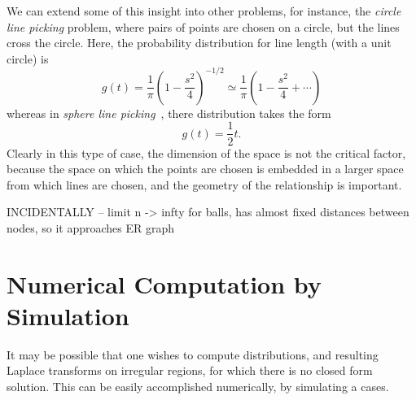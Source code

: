 \documentclass{article}
\begin{document}
We can extend some of this insight into other problems, for instance,
the {\em circle line picking} problem, where pairs of points are
chosen on a circle, but the lines cross the circle. Here, the
probability distribution for line length (with a unit circle) is
\cite{weisstein:_circle_line_picking}
\begin{equation}
  \label{eq:circle_line_picking}
  g(t) = \frac{1}{\pi} \left(    
           1 - \frac{s^2}{4}
               \right)^{-1/2} 
       \simeq \frac{1}{\pi} \left( 1 - \frac{s^2}{4} + \cdots \right) 
\end{equation}
whereas in {\em sphere line
  picking}~\cite{weisstein:_sphere_line_picking}, there distribution
takes the form
\begin{equation}
  \label{eq:sphere_line_picking_approx}
  g(t) = \frac{1}{2} t.
\end{equation}
Clearly in this type of case, the dimension of the space is not the
critical factor, because the space on which the points are chosen is
embedded in a larger space from which lines are chosen, and the
geometry of the relationship is important.


INCIDENTALLY -- limit n -> infty for balls, has almost fixed distances
between nodes, so it approaches ER graph


\section{Numerical Computation by Simulation}
\label{sec:numerical}

It may be possible that one wishes to compute distributions, and
resulting Laplace transforms on irregular regions, for which there is
no closed form solution. This can be easily accomplished numerically,
by simulating a cases.
\end{document}
